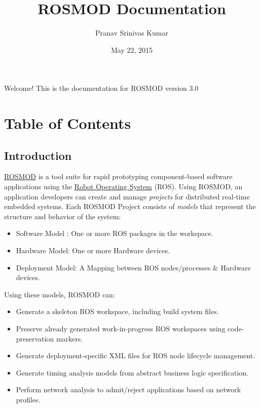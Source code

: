 \documentclass[letterpaper,10pt,english]{sphinxmanual}
\title{ROSMOD Documentation}
\date{May 22, 2015}
\author{Pranav Srinivas Kumar}
\begin{document}
\maketitle
\tableofcontents
{}\label{index::doc}


Welcome! This is the documentation for ROSMOD version 3.0


\chapter{Table of Contents}
\label{index:table-of-contents}\label{index:welcome-to-rosmod-s-documentation}

\section{Introduction}
\label{Introduction:introduction}\label{Introduction::doc}
\href{https://github.com/finger563/rosmod}{ROSMOD} is a tool suite for rapid prototyping component-based software applications using the \href{http://www.ros.org}{Robot Operating System} (ROS). Using ROSMOD, an application developers can create and manage \emph{projects} for distributed real-time embedded systems. Each ROSMOD Project consists of \emph{models} that represent the structure and behavior of the system:
\begin{itemize}
\item {} 
Software Model : One or more ROS packages in the workspace.

\item {} 
Hardware Model: One or more Hardware devices.

\item {} 
Deployment Model: A Mapping between ROS nodes/processes \& Hardware devices.

\end{itemize}

Using these models, ROSMOD can:
\begin{itemize}
\item {} 
Generate a skeleton ROS workspace, including build system files.

\item {} 
Preserve already generated work-in-progress ROS workspaces using code-preservation markers.

\item {} 
Generate deployment-specific XML files for ROS node lifecycle management.

\item {} 
Generate timing analysis models from abstract business logic specification.

\item {} 
Perform network analysis to admit/reject applications based on network profiles.

\end{itemize}
\end{document}
